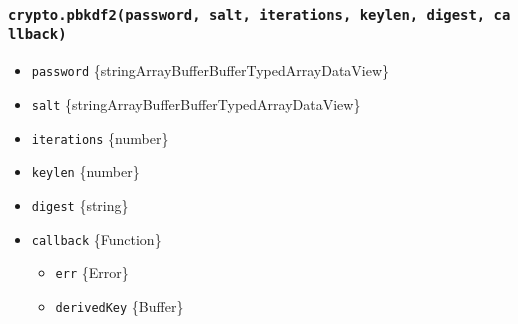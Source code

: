 \begin{Shaded}
\begin{Highlighting}[]
\NormalTok{ \{}
\OperatorTok{,}
\NormalTok{\} }\OperatorTok{=} \NormalTok{(}\NormalTok{)}\OperatorTok{;}
\NormalTok{ \{ }\NormalTok{ \} }\OperatorTok{=} \NormalTok{(}\NormalTok{)}\OperatorTok{;}

\OperatorTok{=} \NormalTok{(}\OperatorTok{,} \OperatorTok{,} \OperatorTok{,} \OperatorTok{,} \NormalTok{)}\OperatorTok{;}
\NormalTok{(}\NormalTok{(}\NormalTok{))}\OperatorTok{;}  
\end{Highlighting}
\end{Shaded}

\subsubsection{\texorpdfstring{\texttt{crypto.pbkdf2(password,\ salt,\ iterations,\ keylen,\ digest,\ callback)}}{crypto.pbkdf2(password, salt, iterations, keylen, digest, callback)}}\label{crypto.pbkdf2password-salt-iterations-keylen-digest-callback}

\begin{itemize}
\tightlist
\item
  \texttt{password}
  \{string\textbar ArrayBuffer\textbar Buffer\textbar TypedArray\textbar DataView\}
\item
  \texttt{salt}
  \{string\textbar ArrayBuffer\textbar Buffer\textbar TypedArray\textbar DataView\}
\item
  \texttt{iterations} \{number\}
\item
  \texttt{keylen} \{number\}
\item
  \texttt{digest} \{string\}
\item
  \texttt{callback} \{Function\}

  \begin{itemize}
  \tightlist
  \item
    \texttt{err} \{Error\}
  \item
    \texttt{derivedKey} \{Buffer\}
  \end{itemize}
\end{itemize}

